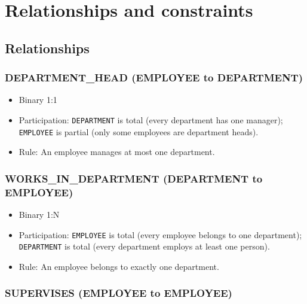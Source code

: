 \documentclass[a4paper,12pt]{report}
\providecommand{\tightlist}{%
  \setlength{\itemsep}{0pt}\setlength{\parskip}{0pt}}
\begin{document}
\chapter{Relationships and constraints}\label{relationships-and-constraints}

\section{Relationships}\label{relationships}

\subsection{\texorpdfstring{DEPARTMENT\texorpdfstring{\_\allowbreak{}}{_}HEAD (EMPLOYEE to DEPARTMENT)}{DEPARTMENTHEAD (EMPLOYEE to DEPARTMENT)}}\label{department_head-employee-to-department}

\begin{itemize}
\tightlist
\item
  Binary 1:1
\item
  Participation: \texttt{DEPARTMENT} is total (\allowbreak{}every department has one manager); \texttt{EMPLOYEE} is partial (\allowbreak{}only some employees are department heads).
\item
  Rule: An employee manages at most one department.
\end{itemize}

\subsection{\texorpdfstring{WORKS\texorpdfstring{\_\allowbreak{}}{_}IN\texorpdfstring{\_\allowbreak{}}{_}DEPARTMENT (DEPARTMENT to EMPLOYEE)}{WORKSINDEPARTMENT (DEPARTMENT to EMPLOYEE)}}\label{works_in_department-department-to-employee}

\begin{itemize}
\tightlist
\item
  Binary 1:N
\item
  Participation: \texttt{EMPLOYEE} is total (\allowbreak{}every employee belongs to one department); \texttt{DEPARTMENT} is total (\allowbreak{}every department employs at least one person).
\item
  Rule: An employee belongs to exactly one department.
\end{itemize}

\subsection{SUPERVISES (EMPLOYEE to EMPLOYEE)}\label{supervises-employee-to-employee}
\end{document}
